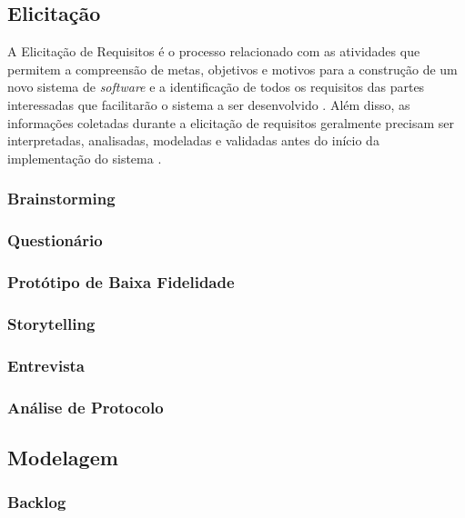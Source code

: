 \subsection {Elicitação}
A Elicitação de Requisitos é o processo relacionado com as atividades que permitem a compreensão de metas, objetivos e motivos para a construção de um novo sistema de \textit{software} e a identificação de todos os requisitos das partes interessadas que facilitarão o sistema a ser desenvolvido \cite{elliott2012software}. Além disso, as informações coletadas durante a elicitação de requisitos geralmente precisam ser interpretadas, analisadas, modeladas e validadas antes do início da implementação do sistema \cite{nuseibeh2000requirements}.

\subsubsection{Brainstorming}

\subsubsection{Questionário}

\subsubsection{Protótipo de Baixa Fidelidade}

\subsubsection{Storytelling}

\subsubsection{Entrevista}

\subsubsection{Análise de Protocolo}

\subsection {Modelagem}

\subsubsection{Backlog}

